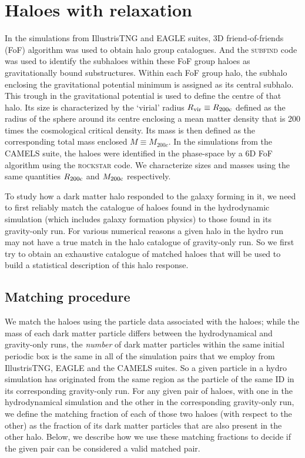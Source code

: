 \section{Haloes with relaxation}
\label{sec:hals}
In the simulations from IllustrisTNG and EAGLE suites, 3D friend-of-friends (FoF) algorithm \citep[see][for details]{2016A&C....15...72M,2019ComAC...6....2N} was used to obtain halo group catalogues. And the \textsc{subfind} code \citep{2001MNRAS.328..726S} was used to identify the subhaloes within these FoF group haloes as gravitationally bound substructures. Within each FoF group halo, the subhalo enclosing the gravitational potential minimum is assigned as its central subhalo. This trough in the gravitational potential is used to define the centre of that halo. Its size is characterized by the `virial' radius $R_{\rm vir}\equiv R_{\rm 200c}$ defined as the radius of the sphere around its centre enclosing a mean matter density that is 200 times the cosmological critical density. Its mass is then defined as the corresponding total mass enclosed $M\equiv M_{200c}$. In the simulations from the CAMELS suite, the haloes were identified in the  phase-space by a 6D FoF algorithm using the \textsc{rockstar} code. We characterize sizes and masses using the same quantities  $R_{\rm 200c}$ and $M_{\rm 200c}$ respectively.


To study how a dark matter halo responded to the galaxy forming in it, we need to first reliably match the catalogue of haloes found in the hydrodynamic simulation (which includes galaxy formation physics) to those found in its gravity-only run. For various numerical reasons a given halo in the hydro run may not have a true match in the halo catalogue of gravity-only run. So we first try to obtain an exhaustive catalogue of matched haloes that will be used to build a statistical description of this halo response.


\subsection{Matching procedure}
\label{sec:methods-match-ch:sims}
We match the haloes using the particle data associated with the haloes;
while the mass of each dark matter particle differs between the hydrodynamical and gravity-only runs, the \emph{number} of dark matter particles within the same initial periodic box is the same in all of the simulation pairs that we employ from IllustrisTNG, EAGLE and the CAMELS suites. So a given particle in a hydro simulation has originated from the same region as the particle of the same ID in its corresponding gravity-only run.
For any given pair of haloes, with one in the hydrodynamical simulation and the other in the corresponding gravity-only run, we define the matching fraction of each of those two haloes (with respect to the other) 
as the fraction of its dark matter particles that are also present in the other halo. Below, we describe how we use 
these matching fractions to decide if the given pair can be considered a valid matched pair. 


